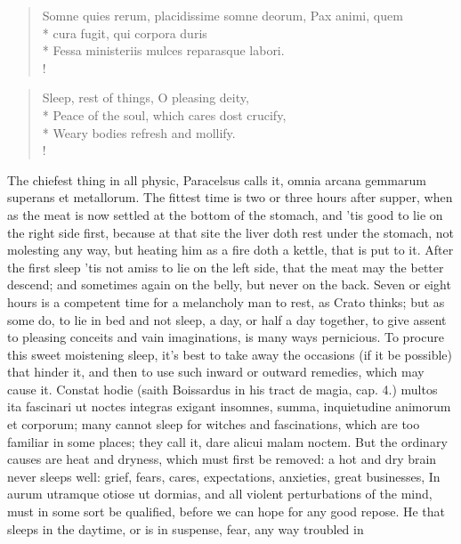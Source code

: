 {%
\begin{latin}%
\begin{verse}%
Somne quies rerum, placidissime somne deorum, Pax animi, quem\\*
cura fugit, qui corpora duris\\*
Fessa ministeriis mulces reparasque labori.\\!
\end{verse}%
\end{latin}%
\translationrule%
\begin{verse}%
Sleep, rest of things, O pleasing deity,\\*
Peace of the soul, which cares dost crucify,\\*
Weary bodies refresh and mollify.\\!
\end{verse}%
%
The chiefest thing in all physic, Paracelsus calls it, omnia
arcana gemmarum superans et metallorum. The fittest time is two
or three hours after supper, when as the meat is now settled at the
bottom of the stomach, and 'tis good to lie on the right side first,
because at that site the liver doth rest under the stomach, not
molesting any way, but heating him as a fire doth a kettle, that is put
to it. After the first sleep 'tis not amiss to lie on the left side,
that the meat may the better descend; and sometimes again on the belly,
but never on the back. Seven or eight hours is a competent time for a
melancholy man to rest, as Crato thinks; but as some do, to lie in bed
and not sleep, a day, or half a day together, to give assent to
pleasing conceits and vain imaginations, is many ways pernicious. To
procure this sweet moistening sleep, it's best to take away the
occasions (if it be possible) that hinder it, and then to use such
inward or outward remedies, which may cause it. Constat hodie (saith
Boissardus in his tract de magia, cap. 4.) multos ita fascinari ut
noctes integras exigant insomnes, summa, inquietudine animorum et
corporum; many cannot sleep for witches and fascinations, which are too
familiar in some places; they call it, dare alicui malam noctem. But
the ordinary causes are heat and dryness, which must first be removed:
a hot and dry brain never sleeps well: grief, fears, cares,
expectations, anxieties, great businesses, In aurum utramque
otiose ut dormias, and all violent perturbations of the mind, must in
some sort be qualified, before we can hope for any good repose. He that
sleeps in the daytime, or is in suspense, fear, any way troubled in
}
